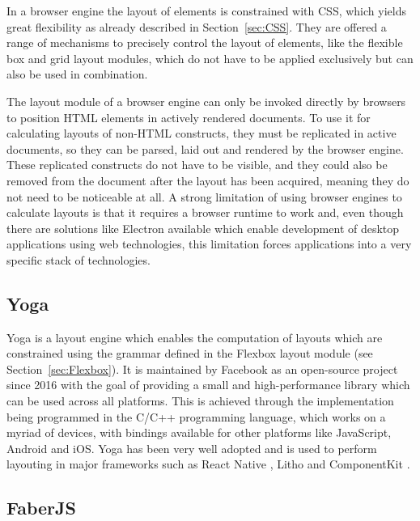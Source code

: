In a browser engine the layout of elements is constrained with CSS, which yields
great flexibility as already described in Section~\ref{sec:CSS}. They are
offered a range of mechanisms to precisely control the layout of elements, like
the flexible box and grid layout modules, which do not have to be applied
exclusively but can also be used in combination.

The layout module of a browser engine can only be invoked directly by browsers to position HTML elements in actively rendered documents. 
To use it for calculating layouts of non-HTML constructs, they must be replicated in active documents, so they can be parsed, laid out and rendered by the browser engine. 
These replicated constructs do not have to be visible, and they could also be removed from the document after the layout has been acquired, meaning they do not need to be noticeable at all. 
A strong limitation of using browser engines to calculate layouts is that it requires a browser runtime to work and, even though there are solutions like Electron available which enable development of desktop applications using web technologies, this limitation forces applications into a very specific stack of technologies. 

\subsection{Yoga}
\label{sec:Yoga}

Yoga \parencite{Yoga} is a layout engine which enables the computation of layouts which are constrained using the grammar defined in the Flexbox layout module (see Section~\ref{sec:Flexbox}). 
It is maintained by Facebook as an open-source project since 2016 \parencite{YogaRelease} with the goal of providing a small and high-performance library which can be used across all platforms. 
This is achieved through the implementation being programmed in the C/C++ programming language, which works on a myriad of devices, with bindings available for other platforms like JavaScript, Android and iOS.
Yoga has been very well adopted and is used to perform layouting in major frameworks such as React Native \parencite{ReactNative}, Litho \parencite{Litho} and ComponentKit \parencite{ComponentKit}.

\subsection{FaberJS}
\label{sec:FaberJS}

